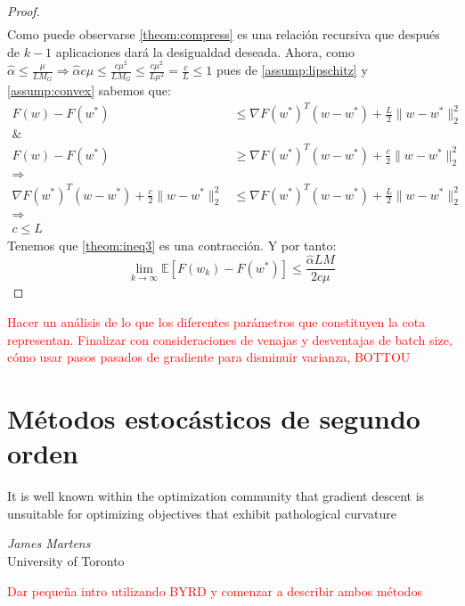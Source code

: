\documentclass{book}
\theoremstyle{plain}
\theoremstyle{definition}
\theoremstyle{remark}
\begin{document}
\begin{proof}
\begin{equation}
\begin{split}
    \end{split}
\end{equation}
Como puede observarse \ref{theom:compress} es una relación recursiva que después de $k-1$ aplicaciones dará la desigualdad deseada. Ahora, como $\hat{\alpha}\leq\frac{\mu}{L M_G}\Rightarrow \hat{\alpha}c\mu\leq \frac{c\mu^2}{LM_G}\leq\frac{c\mu^2}{L\mu^2}=\frac{c}{L}\leq 1$ pues de \ref{assump:lipschitz} y \ref{assump:convex} sabemos que:
\begin{equation*}
    \begin{split}
    F(w) - F(w^*) & \leq \nabla F(w^*)^T(w-w^*) + \frac{L}{2}\|w - w^*\|_2^2 \\
    \& & \\
    F(w) - F(w^*) & \geq \nabla F(w^*)^T(w-w^*) +  \frac{c}{2}\|w - w^*\|_2^2 \\
    \Rightarrow & \\
    \nabla F(w^*)^T(w-w^*) + \frac{c}{2}\|w - w^*\|_2^2 &\leq \nabla F(w^*)^T(w-w^*) + \frac{L}{2}\|w - w^*\|_2^2 \\
    \Rightarrow & \\
    c \leq L
    \end{split}
\end{equation*}
Tenemos que \ref{theom:ineq3} es una contracción. Y por tanto: \begin{equation}
    \displaystyle\lim_{k\rightarrow\infty}\mathbb{E}[F(w_k)- F(w^*)] \leq \frac{\hat{\alpha}LM}{2c\mu}
\end{equation}
\end{proof}

\textcolor{red}{Hacer un análisis de lo que los diferentes parámetros que constituyen la cota representan. Finalizar con consideraciones de venajas y desventajas de batch size, cómo usar pasos pasados de gradiente para disminuir varianza, BOTTOU}


\chapter{Métodos estocásticos de segundo orden}

\epigraph{It is well known within the optimization community that gradient descent is unsuitable for optimizing objectives that exhibit pathological curvature}{\textit{James Martens} \\ University of Toronto}


\newpage

\textcolor{red}{Dar pequeña intro utilizando BYRD y comenzar a describir ambos métodos}
\end{document}
